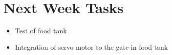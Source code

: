 \section{Next Week Tasks}
\label{sec:nextWeekTasks}
\begin{itemize}
    \item Test of food tank
    \item Integration of servo motor to the gate in food tank
\end{itemize}